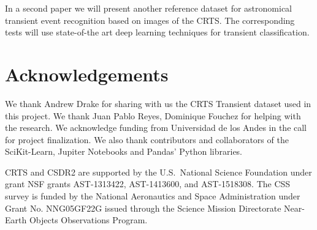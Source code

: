 \documentclass[a4paper,fleqn,usenatbib]{mnras}
\begin{document}
In a second paper we will present another reference dataset for
astronomical transient event recognition based on images of the
CRTS.
The corresponding tests will use  state-of-the art deep learning
techniques for transient classification. 

\section*{Acknowledgements}

We thank Andrew Drake for sharing with us the CRTS Transient dataset
used in this project.  
We thank Juan Pablo Reyes, Dominique Fouchez for helping with the
research.  
We acknowledge funding from Universidad de los Andes in the call for
project finalization.
We also thank contributors and collaborators of the SciKit-Learn,
Jupiter Notebooks and Pandas' Python libraries.  

CRTS and CSDR2 are supported by the U.S.~National Science 
Foundation under grant NSF grants AST-1313422, AST-1413600, and 
AST-1518308.  The CSS survey is funded by the National Aeronautics
and Space Administration under Grant No. NNG05GF22G issued through
the Science Mission Directorate Near-Earth Objects Observations Program.



\end{document}
